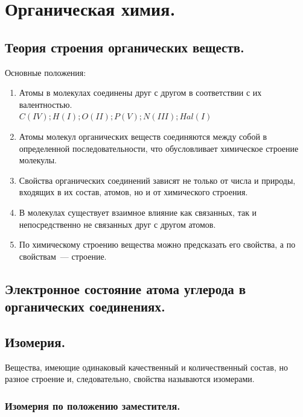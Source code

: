 \documentclass[12pt]{article}
\begin{document}
	
	\tableofcontents
	\setcounter{tocdepth}{3}
	\newpage
	
	\section{Органическая химия.}
	
	\subsection{Теория строения органических веществ.}
	
	\begin{definition}
		Основные положения:
		\begin{enumerate}
			\item Атомы в молекулах соединены друг с другом в соответствии с их валентностью.\\
			$C (IV); H (I); O (II); P (V); N (III); Hal (I)$
			\item Атомы молекул органических веществ соединяются между собой в определенной последовательности, что обусловливает химическое строение молекулы.
			\item Свойства органических соединений зависят не только от числа и природы, входящих в их состав, атомов, но и от химического строения.
			\item В молекулах существует взаимное влияние как связанных, так и непосредственно не связанных друг с другом атомов.
			\item По химическому строению вещества можно предсказать его свойства, а по свойствам~--- строение.
		\end{enumerate}
	\end{definition}
	
	\subsection{Электронное состояние атома углерода в органических соединениях.}
	
	\subsection{Изомерия.}
	
	\begin{definition}
		Вещества, имеющие одинаковый качественный и количественный состав, но разное строение и, следовательно, свойства называются изомерами.
	\end{definition}
	
	\subsubsection{Изомерия по положению заместителя.}
	
\end{document}
